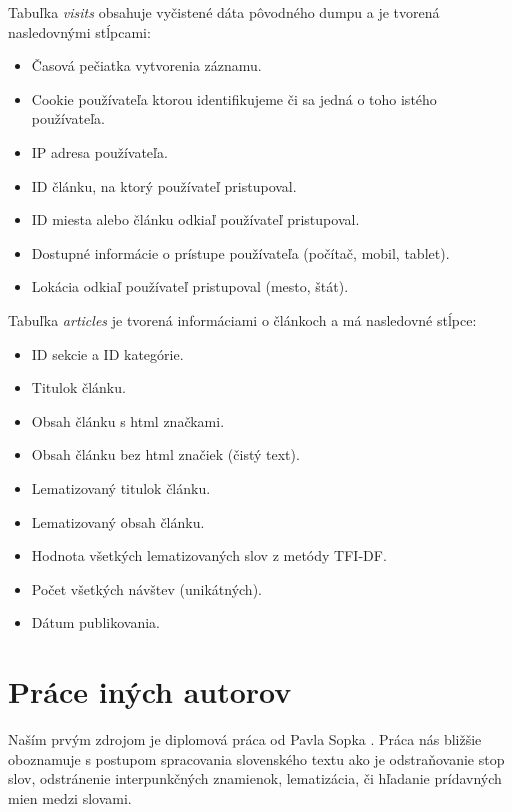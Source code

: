 \documentclass[runningheads,a4paper]{llncs}
\begin{document}
Tabuľka {\em visits} obsahuje vyčistené dáta pôvodného dumpu a je tvorená nasledovnými stĺpcami:
\begin{itemize}
\renewcommand{\labelitemi}{$\bullet$}
  \item Časová pečiatka vytvorenia záznamu.
  \item Cookie používateľa ktorou identifikujeme či sa jedná o toho istého používateľa.
  \item IP adresa používateľa.
  \item ID článku, na ktorý používateľ pristupoval.
  \item ID miesta alebo článku odkiaľ používateľ pristupoval.
  \item Dostupné informácie o prístupe používateľa (počítač, mobil, tablet).
  \item Lokácia odkiaľ používateľ pristupoval (mesto, štát).
\end{itemize}

Tabuľka {\em articles} je tvorená informáciami o článkoch a má nasledovné stĺpce:
\begin{itemize}
\renewcommand{\labelitemi}{$\bullet$}
  \item ID sekcie a ID kategórie.
  \item Titulok článku.
  \item Obsah článku s html značkami.
  \item Obsah článku bez html značiek (čistý text).
  \item Lematizovaný titulok článku.
  \item Lematizovaný obsah článku.
  \item Hodnota všetkých lematizovaných slov z metódy TFI-DF.
  \item Počet všetkých návštev (unikátných).
  \item Dátum publikovania.
\end{itemize}

\section{Práce iných autorov}
Naším prvým zdrojom je diplomová práca od Pavla Sopka \cite{diplomovka}. 
Práca nás bližšie oboznamuje s postupom spracovania slovenského textu ako je odstraňovanie stop slov, odstránenie interpunkčných znamienok, lematizácia, či hľadanie prídavných mien medzi slovami.
\end{document}
